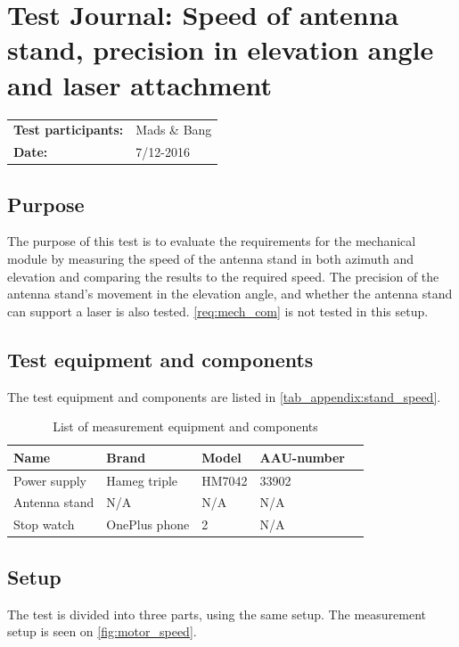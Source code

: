 \chapter{Test Journal: Speed of antenna stand, precision in elevation angle and laser attachment}
\begin{table}[h]
\begin{tabular}{l l}
\textbf{Test participants:} & Mads \& Bang \\
\textbf{Date:}  & 7/12-2016
\end{tabular}
\end{table}

\section*{Purpose}
The purpose of this test is to evaluate the requirements for the mechanical module by measuring the speed of the antenna stand in both azimuth and elevation and comparing the results to the required speed. The precision of the antenna stand's movement in the elevation angle, and whether the antenna stand can support a laser is also tested. \autoref{req:mech_com} is not tested in this setup. 
\section*{Test equipment and components}
The test equipment and components are listed in \autoref{tab_appendix:stand_speed}.
\begin{table}[h]
	\centering
	\caption{List of measurement equipment and components}\label{tab_appendix:stand_speed}
	\begin{tabularx}{\textwidth}{lXXXX}
		Name 					& Brand			& Model 				& AAU-number	\\ \toprule \rowcolor{lightGrey}
		Power supply			& Hameg triple 	& HM7042				& 33902			\\ 
		Antenna stand 	& N/A			& N/A					& N/A \\ \rowcolor{lightGrey}
		Stop watch          	& OnePlus phone & 2                     & N/A \\   
	\end{tabularx}
\end{table}

\section*{Setup}
The test is divided into three parts, using the same setup. The measurement setup is seen on \autoref{fig:motor_speed}.

